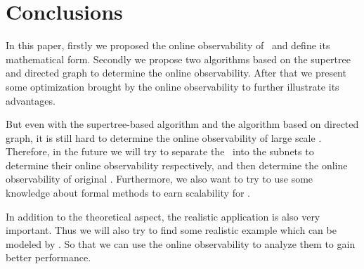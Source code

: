 \section{Conclusions}
\label{sec:con}

In this paper, firstly we proposed the online observability of \BCNs\ and define its mathematical form. Secondly we propose two algorithms based on the supertree and directed graph to determine the online observability. After that we present some optimization brought by the online observability to further illustrate its advantages. %

But even with the supertree-based algorithm and the algorithm based on directed graph, it is still hard to determine the online observability of large scale \BCNs. Therefore, in the future we will try to separate the \BCN\ into the subnets to determine their online observability respectively, and then determine the online observability of original \BCN. Furthermore, we also want to try to use some knowledge about formal methods to earn scalability for \BCNs. 

In addition to the theoretical aspect, the realistic application is also very important. Thus we will also try to find some realistic example which can be modeled by \BCNs. So that we can use the online observability to analyze them to gain better performance.
